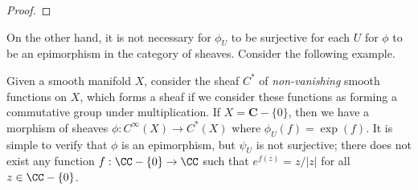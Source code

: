 \begin{proof}
\end{proof}

On the other hand, it is not necessary for $\phi_U$ to be surjective for each $U$ for $\phi$ to be an epimorphism in the category of sheaves. Consider the following example.

\begin{example}
    Given a smooth manifold $X$, consider the sheaf $C^*$ of \emph{non-vanishing} smooth functions on $X$, which forms a sheaf if we consider these functions as forming a commutative group under multiplication. If $X = \mathbf{C} - \{ 0 \}$, then we have a morphism of sheaves $\phi: C^\infty(X) \to C^*(X)$ where $\phi_U(f) = \exp(f)$. It is simple to verify that $\phi$ is an epimorphism, but $\psi_U$ is not surjective; there does not exist any function $f: \CC - \{ 0 \} \to \CC$ such that $e^{f(z)} = z/|z|$ for all $z \in \CC - \{ 0 \}$.
\end{example}

